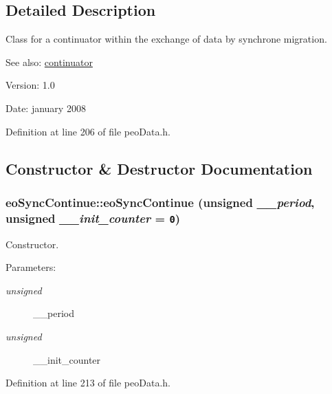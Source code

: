 \subsection{Detailed Description}
Class for a continuator within the exchange of data by synchrone migration. 

\begin{Desc}
\item[See also:]\hyperlink{classcontinuator}{continuator} \end{Desc}
\begin{Desc}
\item[Version:]1.0 \end{Desc}
\begin{Desc}
\item[Date:]january 2008 \end{Desc}




Definition at line 206 of file peo\-Data.h.

\subsection{Constructor \& Destructor Documentation}
\hypertarget{classeoSyncContinue_a1f0cb0e380ffffd964031c4aa0f7086}{
\subsubsection[eoSyncContinue]{\setlength{\rightskip}{0pt plus 5cm}eo\-Sync\-Continue::eo\-Sync\-Continue (unsigned {\em \_\-\_\-period}, unsigned {\em \_\-\_\-init\_\-counter} = {\tt 0})}}
\label{classeoSyncContinue_a1f0cb0e380ffffd964031c4aa0f7086}


Constructor. 

\begin{Desc}
\item[Parameters:]
\begin{description}
\item[{\em unsigned}]\_\-\_\-period \item[{\em unsigned}]\_\-\_\-init\_\-counter \end{description}
\end{Desc}


Definition at line 213 of file peo\-Data.h.

